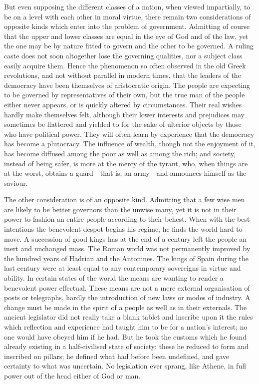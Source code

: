 \documentclass[11pt,letter]{article}
\begin{document}
\par  But even supposing the different classes of a nation, when viewed impartially, to be on a level with each other in moral virtue, there remain two considerations of opposite kinds which enter into the problem of government. Admitting of course that the upper and lower classes are equal in the eye of God and of the law, yet the one may be by nature fitted to govern and the other to be governed. A ruling caste does not soon altogether lose the governing qualities, nor a subject class easily acquire them. Hence the phenomenon so often observed in the old Greek revolutions, and not without parallel in modern times, that the leaders of the democracy have been themselves of aristocratic origin. The people are expecting to be governed by representatives of their own, but the true man of the people either never appears, or is quickly altered by circumstances. Their real wishes hardly make themselves felt, although their lower interests and prejudices may sometimes be flattered and yielded to for the sake of ulterior objects by those who have political power. They will often learn by experience that the democracy has become a plutocracy. The influence of wealth, though not the enjoyment of it, has become diffused among the poor as well as among the rich; and society, instead of being safer, is more at the mercy of the tyrant, who, when things are at the worst, obtains a guard—that is, an army—and announces himself as the saviour.

\par  The other consideration is of an opposite kind. Admitting that a few wise men are likely to be better governors than the unwise many, yet it is not in their power to fashion an entire people according to their behest. When with the best intentions the benevolent despot begins his regime, he finds the world hard to move. A succession of good kings has at the end of a century left the people an inert and unchanged mass. The Roman world was not permanently improved by the hundred years of Hadrian and the Antonines. The kings of Spain during the last century were at least equal to any contemporary sovereigns in virtue and ability. In certain states of the world the means are wanting to render a benevolent power effectual. These means are not a mere external organisation of posts or telegraphs, hardly the introduction of new laws or modes of industry. A change must be made in the spirit of a people as well as in their externals. The ancient legislator did not really take a blank tablet and inscribe upon it the rules which reflection and experience had taught him to be for a nation's interest; no one would have obeyed him if he had. But he took the customs which he found already existing in a half-civilised state of society: these he reduced to form and inscribed on pillars; he defined what had before been undefined, and gave certainty to what was uncertain. No legislation ever sprang, like Athene, in full power out of the head either of God or man.
\end{document}
